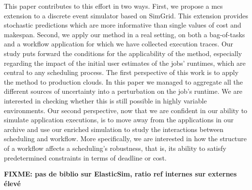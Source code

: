 \documentclass[10pt,conference,compsocconf]{IEEEtran}
\begin{document}
This paper contributes to this effort in two ways. First, we propose a
\acl{mcs} extension to a discrete event simulator based on SimGrid. This
extension provides stochastic predictions which are more informative than single
values of cost and makespan. Second, we apply our method in a real setting,
on both a bag-of-tasks and a workflow application for which we have collected
execution traces. Our study puts forward the conditions for the applicability of
the method, especially regarding the impact of the initial user estimates of the
jobs' runtimes, which are central to any scheduling process. The first
perspective of this work is to apply the method to production clouds. In this
paper we managed to aggregate all the different sources of uncertainty into a
perturbation on the job's runtime. We are interested in checking whether this is
still possible in highly variable environments. Our second perspective, now that
we are confident in our ability to simulate application executions, is to move
away from the applications in our archive and use our enriched simulation to
study the interactions between scheduling and workflow. More specifically, we
are interested in how the structure of a workflow affects a scheduling's
robustness, that is, its ability to satisfy predetermined constraints in terms of
deadline or cost.




\textbf{FIXME: pas de biblio sur ElasticSim, ratio ref internes sur externes élevé}






\newpage
\end{document}
